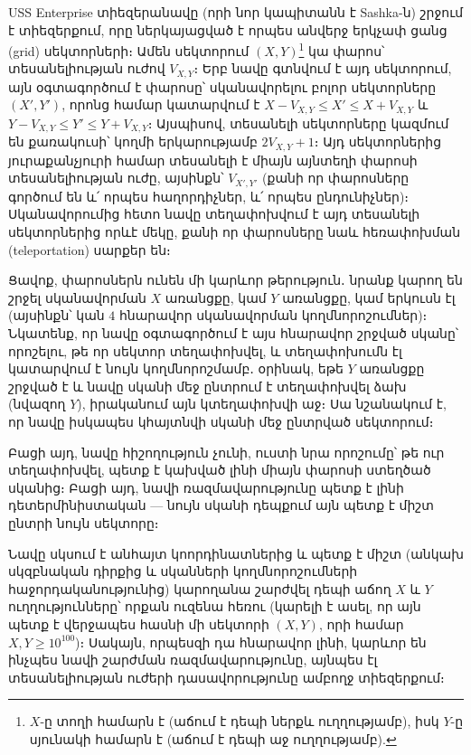 \documentclass[12pt]{article}
\begin{document}
\renewcommand{\headerLang}{English}
\renewcommand{\problemName}{AB13. Vision}

\renewcommand{\headerLeft}{IATI Day 1, Senior group}
\renewcommand{\headerRightFirst}{XVII INTERNATIONAL ADVANCED TOURNAMENT IN INFORMATICS}
\renewcommand{\headerRightSecond}{ONLINE 2026}

\renewcommand{\tl}{$5$ s}
\renewcommand{\ml}{$1024$ MB}
\problem{Task \problemName}

USS Enterprise տիեզերանավը (որի նոր կապիտանն է Sashka-ն) շրջում է տիեզերքում, որը ներկայացված է որպես անվերջ երկչափ ցանց (grid) սեկտորների։ Ամեն սեկտորում $(X, Y)$\footnote{$X$-ը տողի համարն է (աճում է դեպի ներքև ուղղությամբ), իսկ $Y$-ը սյունակի համարն է (աճում է դեպի աջ ուղղությամբ).} կա փարոս՝ տեսանելիության ուժով $V_{X, Y}$։ Երբ նավը գտնվում է այդ սեկտորում, այն օգտագործում է փարոսը՝ սկանավորելու բոլոր սեկտորները $(X', Y')$, որոնց համար կատարվում է $X - V_{X, Y} \leq X' \leq X + V_{X, Y}$ և $Y - V_{X, Y} \leq Y' \leq Y + V_{X, Y}$։ Այսպիսով, տեսանելի սեկտորները կազմում են քառակուսի՝ կողմի երկարությամբ $2V_{X, Y} + 1$։ Այդ սեկտորներից յուրաքանչյուրի համար տեսանելի է միայն այնտեղի փարոսի տեսանելիության ուժը, այսինքն՝ $V_{X', Y'}$ (քանի որ փարոսները գործում են և՛ որպես հաղորդիչներ, և՛ որպես ընդունիչներ)։ Սկանավորումից հետո նավը տեղափոխվում է այդ տեսանելի սեկտորներից որևէ մեկը, քանի որ փարոսները նաև հեռափոխման (teleportation) սարքեր են։

Ցավոք, փարոսներն ունեն մի կարևոր թերություն․ նրանք կարող են շրջել սկանավորման $X$ առանցքը, կամ $Y$ առանցքը, կամ երկուսն էլ (այսինքն՝ կան $4$ հնարավոր սկանավորման կողմնորոշումներ)։ Նկատենք, որ նավը օգտագործում է այս հնարավոր շրջված սկանը՝ որոշելու, թե որ սեկտոր տեղափոխվել, և տեղափոխումն էլ կատարվում է նույն կողմնորոշմամբ․ օրինակ, եթե $Y$ առանցքը շրջված է և նավը սկանի մեջ ընտրում է տեղափոխվել ձախ (նվազող $Y$), իրականում այն կտեղափոխվի աջ։ Սա նշանակում է, որ նավը իսկապես կհայտնվի սկանի մեջ ընտրված սեկտորում։

Բացի այդ, նավը հիշողություն չունի, ուստի նրա որոշումը՝ թե ուր տեղափոխվել, պետք է կախված լինի միայն փարոսի ստեղծած սկանից։ Բացի այդ, նավի ռազմավարությունը պետք է լինի դետերմինիստական — նույն սկանի դեպքում այն պետք է միշտ ընտրի նույն սեկտորը։

Նավը սկսում է անհայտ կոորդինատներից և պետք է միշտ (անկախ սկզբնական դիրքից և սկանների կողմնորոշումների հաջորդականությունից) կարողանա շարժվել դեպի աճող $X$ և $Y$ ուղղությունները՝ որքան ուզենա հեռու (կարելի է ասել, որ այն պետք է վերջապես հասնի մի սեկտորի $(X, Y)$, որի համար $X, Y \geq 10^{100}$)։ Սակայն, որպեսզի դա հնարավոր լինի, կարևոր են ինչպես նավի շարժման ռազմավարությունը, այնպես էլ տեսանելիության ուժերի դասավորությունը ամբողջ տիեզերքում։
\end{document}
